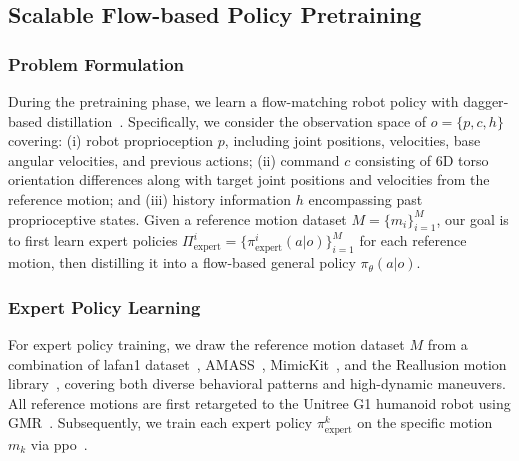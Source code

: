\subsection{Scalable Flow-based Policy Pretraining} 
 
\subsubsection{Problem Formulation} During the pretraining phase, we learn a flow-matching robot policy with \ac{dagger}-based distillation~\cite{ross2011reduction,tessler2025maskedmanipulator}. Specifically, we consider the observation space of $o = \{p, c, h\}$ covering: (i) robot proprioception $p$, including joint positions, velocities, base angular velocities, and previous actions; (ii) command $c$ consisting of 6D torso orientation differences along with target joint positions and velocities from the reference motion; and (iii) history information $h$ encompassing past proprioceptive states. Given a reference motion dataset $M = \{m_i\}_{i=1}^{M}$, our goal is to first learn expert policies $\Pi_{\text{expert}}^i = \{\pi_{\text{expert}}^i(a | o)\}_{i=1}^{M}$ for each reference motion, then distilling it into a flow-based general policy $\pi_\theta(a|o)$.

\subsubsection{Expert Policy Learning} For expert policy training, we draw the reference motion dataset $M$ from a combination of \ac{lafan1} dataset~\cite{harvey2020robust}, AMASS~\cite{mahmood2019amass}, MimicKit~\cite{peng2025mimickit}, and the Reallusion motion library~\cite{reallusion}, covering both diverse behavioral patterns and high-dynamic maneuvers. All reference motions are first retargeted to the Unitree G1 humanoid robot using GMR~\cite{ze2025twist,joao2025gmr}. Subsequently, we train each expert policy $\pi_{\text{expert}}^k$ on the specific motion $m_k$ via \ac{ppo}~\cite{schulman2017proximal}.



